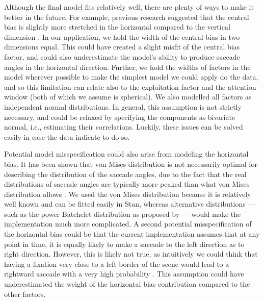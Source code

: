 \documentclass{article}
\begin{document}
Although the final model fits relatively well, there are plenty of ways to make it better in the future. For example, previous research suggested that the central bias is slightly more stretched in the horizontal compared to the vertical dimension \citep{tatler2007central,clarke2014deriving}. In our application, we hold the width of the central bias in two dimensions equal. This could have created a slight misfit of the central bias factor, and could also underestimate the model's ability to produce saccade angles in the horizontal direction. Further, we hold the widths of factors in the model wherever possible to make the simplest model we could apply do the data, and so this limitation can relate also to the exploitation factor and the attention window (both of which we assume is spherical). We also modelled all factors as independent normal distributions. In general, this assumption is not strictly necessary, and could be relaxed by specifying the components as bivariate normal, i.e., estimating their correlations. Luckily, these issues can be solved easily in case the data indicate to do so.

Potential model misspecification could also arise from modeling the horizontal bias. It has been shown that von Mises distribution is not necessarily optimal for describing the distribution of the saccade angles, due to the fact that the real distributions of saccade angles are typically more peaked than what von Mises distribution allows \citep{mulder2020mixtures}. We used the von Mises distribution because it is relatively well known and can be fitted easily in Stan, whereas alternative distributions --- such as the power Batchelet distribution as proposed by \citet{mulder2020mixtures} --- would make the implementation much more complicated. A second potential misspecification of the horizontal bias could be that the current implementation assumes that at any point in time, it is equally likely to make a saccade to the left direction as to right direction. However, this is likely not true, as intuitively we could think that having a fixation very close to a left border of the scene would lead to a rightward saccade with a very high probability \citep{clarke2017saccadic}. This assumption could have underestimated the weight of the horizontal bias contribution compared to the other factors. 
\end{document}
